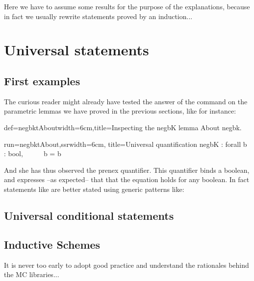 Here we have to assume some results for the purpose of the
explanations, because in fact we usually rewrite statements proved by
an induction...
\section{Universal statements}

\subsection{First examples}
The curious reader might already have tested the answer of the
 command on the parametric lemmas we have proved in the
previous sections, like for instance:

\begin{coq}{def=negbktAbout}{width=6cm,title=Inspecting the negbK lemma}
About negbk.
\end{coq}
\begin{coqout}{run=negbktAbout,ssr}{width=6cm, title=Universal quantification}
negbK : forall b : bool, ~~ ~~ b = b
\end{coqout}

And she has thus observed the prenex  quantifier. This
quantifier binds a boolean, and expresses --as expected-- that that
the equation holds for any boolean. In fact statements like 
are better stated using generic patterns like:

\subsection{Universal conditional statements}

\subsection{Inductive Schemes}

It is never too early to adopt good practice and understand the
rationales behind the MC libraries...

